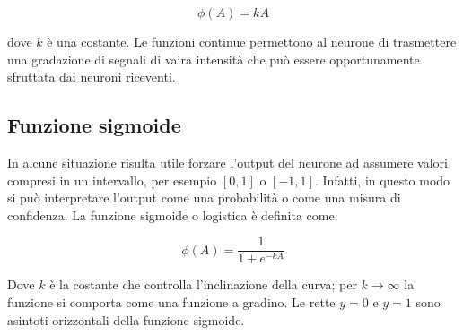 \begin{equation*}
	\phi(A) = kA
\end{equation*}

dove $k$ è una costante. Le funzioni continue permettono al neurone di
trasmettere una gradazione di segnali di vaira intensità che può essere
opportunamente sfruttata dai neuroni riceventi.

\begin{center}
\end{center}

\subsection{Funzione sigmoide}

In alcune situazione risulta utile forzare l'output del neurone ad assumere
valori compresi in un intervallo, per esempio $[0, 1]$ o $[-1, 1]$. Infatti, in
questo modo si può interpretare l'output come una probabilità o come una
misura di confidenza. La funzione sigmoide o logistica è definita come:

\begin{equation*}
	\phi(A) = \frac{1}{1 + e^{-kA}}
\end{equation*}

Dove $k$ è la costante che controlla l'inclinazione della curva; per $k
	\rightarrow \infty$ la funzione si comporta come una funzione a gradino. Le
rette $y = 0$ e $y = 1$ sono asintoti orizzontali della funzione sigmoide.

\begin{center}
\end{center}

